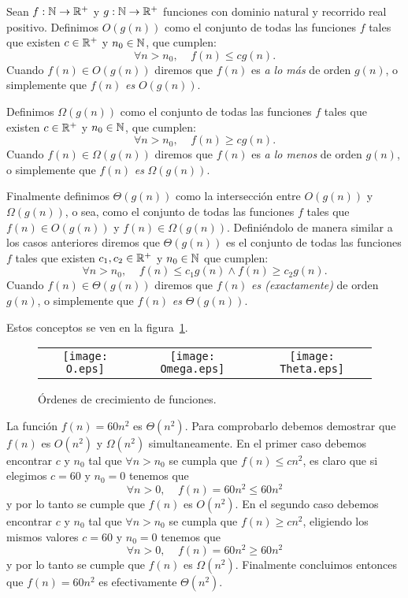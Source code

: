 \begin{definicion}
Sean $f:\mathbb{N}\rightarrow\mathbb{R}^+$ y $g:\mathbb{N}\rightarrow\mathbb{R}^+$ funciones con dominio natural y recorrido real positivo.
	Definimos $O(g(n))$ como el conjunto de todas las funciones $f$ tales que existen $c\in\mathbb{R}^+$ y $n_0\in\mathbb{N}$, que cumplen:
	\[
	\forall n>n_0,\;\;\;\; f(n)\leq cg(n).
	\]
	Cuando $f(n)\in O(g(n))$ diremos que $f(n)$ es \emph{a lo más} de orden $g(n)$, o simplemente que $f(n)$ \emph{es} $O(g(n))$.
	
	Definimos $\Omega(g(n))$ como el conjunto de todas las funciones $f$ tales que existen $c\in\mathbb{R}^+$ y $n_0\in\mathbb{N}$, que cumplen:
	\[
	\forall n>n_0,\;\;\;\; f(n)\geq cg(n).
	\]
	Cuando $f(n)\in \Omega(g(n))$ diremos que $f(n)$ es \emph{a lo menos} de orden $g(n)$, o simplemente que $f(n)$ \emph{es} $\Omega(g(n))$.

  Finalmente definimos $\Theta(g(n))$ como la intersección entre $O(g(n))$ y $\Omega(g(n))$, o sea, como el conjunto de todas las funciones $f$ tales que $f(n)\in O(g(n))$ y $f(n)\in\Omega(g(n))$.
  Definiéndolo de manera similar a los casos anteriores diremos que $\Theta(g(n))$ es el conjunto de todas las funciones $f$ tales que existen $c_1,c_2\in\mathbb{R}^+$ y $n_0\in\mathbb{N}$ que cumplen:
  \[
	\forall n>n_0,\;\;\;\; f(n)\leq c_1g(n)\wedge f(n)\geq c_2g(n).
	\]
  Cuando $f(n)\in \Theta(g(n))$ diremos que $f(n)$ \emph{es (exactamente)} de orden $g(n)$, o simplemente que $f(n)$ \emph{es} $\Theta(g(n))$.
  
  Estos conceptos se ven en la figura~\ref{fig:complexity-notation}.
\end{definicion}

\begin{figure}[h!]
\centering 
\begin{tabular}{ccc}
\texttt{[image: O.eps]}&
\texttt{[image: Omega.eps]}&
\texttt{[image: Theta.eps]}
\end{tabular}
\caption{Órdenes de crecimiento de funciones.}
\label{fig:complexity-notation}
\end{figure}

\begin{ejemplo}
La función $f(n)=60n^2$ es $\Theta(n^2)$.
Para comprobarlo debemos demostrar que $f(n)$ es $O(n^2)$ y $\Omega(n^2)$ simultaneamente.
En el primer caso debemos encontrar $c$ y $n_0$ tal que $\forall n>n_0$ se cumpla que $f(n)\leq cn^2$, es claro que si elegimos $c=60$ y $n_0=0$ tenemos que
\[
\forall n>0,\;\;\;\; f(n)=60n^2\leq 60n^2
\]
y por lo tanto se cumple que $f(n)$ es $O(n^2)$.
En el segundo caso debemos encontrar $c$ y $n_0$ tal que $\forall n>n_0$ se cumpla que $f(n)\geq cn^2$, eligiendo los mismos valores $c=60$ y $n_0=0$ tenemos que
\[
\forall n>0,\;\;\;\; f(n)=60n^2\geq 60n^2
\]
y por lo tanto se cumple que $f(n)$ es $\Omega(n^2)$.
Finalmente concluimos entonces que $f(n)=60n^2$ es efectivamente $\Theta(n^2)$.
\end{ejemplo}

